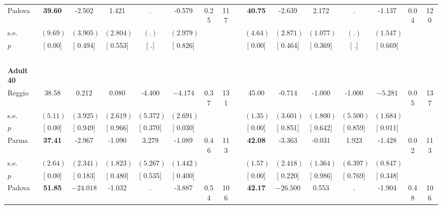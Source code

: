 \begin{longtable}{L{8em} c c c c c c c p{1em} c c c c c c c}
\quad \quad \quad Padova& \textbf{    39.60} &    -2.502 &     1.421 &         . &    -0.579 &      0.25 &       117 & & \textbf{    40.75} &    -2.639 &     2.172 &         . &    -1.137 &      0.04 &       120  \\*
\quad \quad \quad \quad s.e.& $ (     9.69)$ & $ (    3.905)$ & $ (    2.804)$ & $ (        .)$ & $ (    2.979)$ & & & & $ (     4.64)$ & $ (    2.871)$ & $ (    1.077)$ & $ (        .)$ & $ (    1.547)$ & &  \\*
\quad \quad \quad \quad $ p$ & [     0.00] & [    0.494] & [    0.553] & [        .] & [    0.826] & & & & [     0.00] & [    0.464] & [    0.369] & [        .] & [    0.669] & &  \\[1em]
~\\[1em]
\quad \quad \textbf{Adult 40} & & & & & & & & & & & & & & & \\* 
\quad \quad \quad Reggio& 38.58 &     0.212 &     0.080 &    -4.400 & $ \mathbf{   -4.174}$ &      0.37 &       131 & & 45.00 &    -0.714 &    -1.000 &    -1.000 & $ \mathbf{   -5.281}$ &      0.05 &       137  \\*
\quad \quad \quad \quad s.e.& $ (     5.11)$ & $ (    3.925)$ & $ (    2.619)$ & $ (    5.372)$ & $ (    2.691)$ & & & & $ (     1.35)$ & $ (    3.601)$ & $ (    1.800)$ & $ (    5.500)$ & $ (    1.684)$ & &  \\*
\quad \quad \quad \quad $ p$ & [     0.00] & [    0.949] & [    0.966] & [    0.370] & [    0.030] & & & & [     0.00] & [    0.851] & [    0.642] & [    0.859] & [    0.011] & &  \\[1em]
\quad \quad \quad Parma& \textbf{    37.41} &    -2.967 &    -1.090 &     3.279 &    -1.089 &      0.46 &       113 & & \textbf{    42.08} &    -3.363 &    -0.031 &     1.923 &    -1.428 &      0.02 &       113  \\*
\quad \quad \quad \quad s.e.& $ (     2.64)$ & $ (    2.341)$ & $ (    1.823)$ & $ (    5.267)$ & $ (    1.442)$ & & & & $ (     1.57)$ & $ (    2.418)$ & $ (    1.364)$ & $ (    6.397)$ & $ (    0.847)$ & &  \\*
\quad \quad \quad \quad $ p$ & [     0.00] & [    0.183] & [    0.480] & [    0.535] & [    0.400] & & & & [     0.00] & [    0.220] & [    0.986] & [    0.769] & [    0.348] & &  \\[1em]
\quad \quad \quad Padova& \textbf{    51.85} & $ \mathbf{  -24.018}$ &    -1.032 &         . &    -3.887 &      0.54 &       106 & & \textbf{    42.17} & $ \mathbf{  -26.500}$ &     0.553 &         . &    -1.904 &      0.48 &       106  \\*

\end{longtable}
